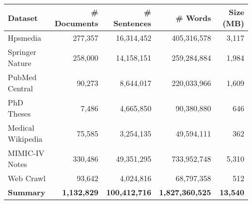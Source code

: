 \begin{tabular}{lrrrr}
    \toprule
    \bfseries Dataset & \bfseries \# Documents & \bfseries \# Sentences & \bfseries \# Words & \bfseries Size (MB) \\
    \midrule
    Hpsmedia & 277,357 & 16,314,452 & 405,316,578 & 3,117 \\
    Springer Nature & 258,000 & 14,158,151 & 259,284,884 & 1,984 \\
    PubMed Central & 90,273 & 8,644,017 & 220,033,966 & 1,609 \\
    PhD Theses & 7,486 & 4,665,850 & 90,380,880 & 646 \\
    Medical Wikipedia & 75,585 & 3,254,135 & 49,594,111 & 362 \\
    MIMIC-IV Notes & 330,486 & 49,351,295 & 733,952,748 & 5,310 \\
    Web Crawl & 93,642 & 4,024,816 & 68,797,358 & 512 \\
    \midrule
    \bfseries Summary & \bfseries 1,132,829 & \bfseries 100,412,716 & \bfseries 1,827,360,525 & \bfseries 13,540 \\
    \bottomrule
    \end{tabular}
    